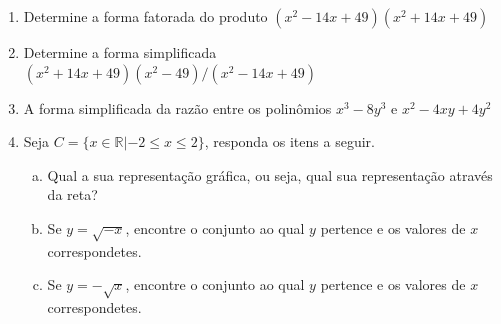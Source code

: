 \documentclass[12pt,onepage,a4paper]{memoir}
\begin{document}
\begin{enumerate}
\item Determine a forma fatorada do produto $(x^2 - 14x + 49 )(x^2 + 14x + 49 )$
\item Determine a forma simplificada $(x^2 + 14x + 49)( x^2 - 49)/(x^2 - 14x +
  49)$
  \item  A forma simplificada da razão entre os polinômios $x^3 - 8y^3$ e $x^2 -
    4xy + 4y^2$

  \item Seja $C=\{ x \in \mathbb{R} | -2 \leq x \leq 2  \}$, responda os itens a seguir.  

    \begin{enumerate}[a)]
    \item  Qual a sua representação gráfica, ou seja, qual sua representação
      através da reta?
    \item  Se $y = \sqrt{-x}$, encontre o conjunto ao qual $y$ pertence e os
valores de $x$ correspondetes.
    \item Se $y = -\sqrt{x}$,  encontre o conjunto ao qual $y$ pertence e os
valores de $x$ correspondetes.
    \end{enumerate}


    
\end{enumerate} %
\end{document}
